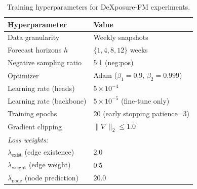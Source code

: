 \begin{table}[t]
\centering
\small
\setlength{\tabcolsep}{6pt}
\renewcommand{\arraystretch}{1.05}
\begin{tabular}{ll}
\hline
\textbf{Hyperparameter} & \textbf{Value} \\
\hline
Data granularity & Weekly snapshots \\
Forecast horizons $h$ & $\{1, 4, 8, 12\}$ weeks \\
Negative sampling ratio & 5:1 (neg:pos) \\
Optimizer & Adam ($\beta_1=0.9$, $\beta_2=0.999$) \\
Learning rate (heads) & $5 \times 10^{-4}$ \\
Learning rate (backbone) & $5 \times 10^{-5}$ (fine-tune only) \\
Training epochs & 20 (early stopping patience=3) \\
Gradient clipping & $\|\nabla\|_2 \le 1.0$ \\
\hline
\multicolumn{2}{l}{\textit{Loss weights:}} \\
$\lambda_{\mathrm{exist}}$ (edge existence) & $2.0$ \\
$\lambda_{\mathrm{weight}}$ (edge weight) & $0.5$ \\
$\lambda_{\mathrm{node}}$ (node prediction) & $20.0$ \\
\hline
\end{tabular}
\caption{Training hyperparameters for DeXposure-FM experiments.}
\label{tab:training-hparams}
\end{table}
